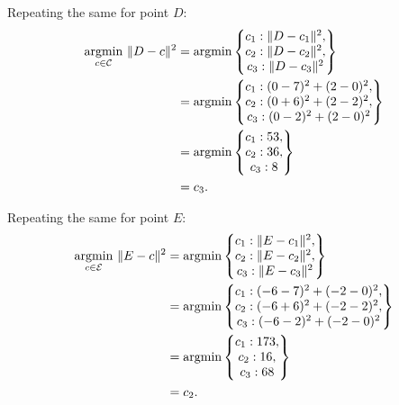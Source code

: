 Repeating the same for point $D$:
\begin{align}
   \operatorname*{argmin}_{c \in \mathcal C}\ \lVert D - c \rVert^2\nonumber
       &= \operatorname*{argmin} \left\{
       \begin{matrix}
         c_1 : \lVert D - c_1 \rVert^2,\\
         c_2 : \lVert D - c_2 \rVert^2,\\
         c_3 : \lVert D - c_3 \rVert^2
       \end{matrix}
       \right\}\nonumber\\
     &= \operatorname*{argmin} \left\{
     \begin{matrix}
       c_1 : (0 - 7)^2 + (2 - 0)^2,\\
       c_2 : (0 + 6)^2 + (2 - 2)^2,\\
       c_3 : (0 - 2)^2 + (2 - 0)^2
     \end{matrix}
     \right\}\\
     &= \operatorname*{argmin} \left\{
     \begin{matrix}
       c_1 : 53,\\
       c_2 : 36,\\
       c_3 : 8 
     \end{matrix}
     \right\}\nonumber\\
   &= c_3.\label{eq:cluster_assignment}
\end{align}

Repeating the same for point $E$:
\begin{align}
   \operatorname*{argmin}_{c \in \mathcal E}\ \lVert E - c \rVert^2\nonumber
       &= \operatorname*{argmin} \left\{
       \begin{matrix}
         c_1 : \lVert E - c_1 \rVert^2,\\
         c_2 : \lVert E - c_2 \rVert^2,\\
         c_3 : \lVert E - c_3 \rVert^2
       \end{matrix}
       \right\}\nonumber\\
     &= \operatorname*{argmin} \left\{
     \begin{matrix}
       c_1 : (-6- 7)^2 + (-2- 0)^2,\\
       c_2 : (-6+ 6)^2 + (-2- 2)^2,\\
       c_3 : (-6- 2)^2 + (-2- 0)^2
     \end{matrix}
     \right\}\nonumber\\
     &= \operatorname*{argmin} \left\{
     \begin{matrix}
       c_1 : 173,\\
       c_2 : 16,\\
       c_3 : 68
     \end{matrix}
     \right\}\nonumber\\
   &= c_2.\label{eq:cluster_assignment}
\end{align}

